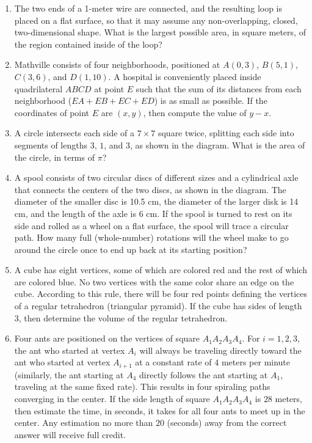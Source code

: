\documentclass[11pt]{article}
\begin{document}
\begin{enumerate}[1.]
			\item The two ends of a 1-meter wire are connected, and the resulting loop is placed on a flat surface, so that it may assume any non-overlapping, closed, two-dimensional shape. What is the largest possible area, in square meters, of the region contained inside of the loop?
			
			\item Mathville consists of four neighborhoods, positioned at $A(0, 3)$, $B(5, 1)$, $C(3, 6)$, and $D(1, 10)$. A hospital is conveniently placed inside quadrilateral $ABCD$ at point $E$ such that the sum of its distances from each neighborhood ($EA + EB + EC + ED$) is as small as possible. If the coordinates of point $E$ are $(x, y)$, then compute the value of $y - x$.
			
			\item A circle intersects each side of a $7 \times 7$ square twice, splitting each side into segments of lengths $3$, $1$, and $3$, as shown in the diagram. What is the area of the circle, in terms of $\pi$?
			
			\item A spool consists of two circular discs of different sizes and a cylindrical axle that connects the centers of the two discs, as shown in the diagram. The diameter of the smaller disc is 10.5 cm, the diameter of the larger disk is 14 cm, and the length of the axle is 6 cm. If the spool is turned to rest on its side and rolled as a wheel on a flat surface, the spool will trace a circular path. How many full (whole-number) rotations will the wheel make to go around the circle once to end up back at its starting position?
			
			\item A cube has eight vertices, some of which are colored red and the rest of which are colored blue. No two vertices with the same color share an edge on the cube. According to this rule, there will be four red points defining the vertices of a regular tetrahedron (triangular pyramid). If the cube has sides of length 3, then determine the volume of the regular tetrahedron.
			
			\item Four ants are positioned on the vertices of square $A_1A_2A_3A_4$. For $i = 1, 2, 3$, the ant who started at vertex $A_i$ will always be traveling directly toward the ant who started at vertex $A_{i+1}$ at a constant rate of $4$ meters per minute (similarly, the ant starting at $A_4$ directly follows the ant starting at $A_1$, traveling at the same fixed rate). This results in four spiraling paths converging in the center. If the side length of square $A_1A_2A_3A_4$ is $28$ meters, then estimate the time, in seconds, it takes for all four ants to meet up in the center. Any estimation no more than $20$ (seconds) away from the correct answer will receive full credit.
		\end{enumerate}
\end{document}
